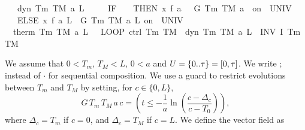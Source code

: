 \documentclass[envcountsame,envcountsect]{llncs}
\begin{document}
\begin{example}
\begin{isabellebody}
\ \ \ {\isachardoublequoteopen}dyn\ T\isactrlsub m\ T\isactrlsub M\ a\ L\ {\isasymtau}\ {\isasymequiv}\ \isanewline
\ \ {\isacharparenleft}IF\ {\isacharparenleft}{\isasymtheta}\ {\isacharequal}\ {}{\isacharparenright}\ THEN\ {\isacharparenleft}x{\isasymacute}{\isacharequal}\ f\ a\ {}\ {\isacharampersand}\ G\ T\isactrlsub m\ T\isactrlsub M\ a\ {}\ on\ {\isacharbraceleft}{}{\isachardot}{\isachardot}{\isasymtau}{\isacharbraceright}\ UNIV\ {\isacharat}\ {}{\isacharparenright}\ \isanewline
\ \ \ ELSE\ {\isacharparenleft}x{\isasymacute}{\isacharequal}\ f\ a\ L\ {\isacharampersand}\ G\ T\isactrlsub m\ T\isactrlsub M\ a\ L\ on\ {\isacharbraceleft}{}{\isachardot}{\isachardot}{\isasymtau}{\isacharbraceright}\ UNIV\ {\isacharat}\ {}{\isacharparenright}{\isacharparenright}{\isachardoublequoteclose}\isanewline
\isanewline
{}\isanewline
\ \ {\isachardoublequoteopen}therm\ T\isactrlsub m\ T\isactrlsub M\ a\ L\ {\isasymtau}\ {\isasymequiv}\ LOOP\ {\isacharparenleft}ctrl\ T\isactrlsub m\ T\isactrlsub M\ {\isacharsemicolon}\ dyn\ T\isactrlsub m\ T\isactrlsub M\ a\ L\ {\isasymtau}{\isacharparenright}\ INV\ {\isacharparenleft}I\ T\isactrlsub m\ T\isactrlsub M{\isacharparenright}{\isachardoublequoteclose}\isanewline
\end{isabellebody}

We assume that $0<T_m$, $T_M<L$, $0 < a$ and
$U={\emph{$\{$}}{0}{\emph{$\mathord.$}}{\emph{$\mathord.$}}{\emph{$\tau$}}{\emph{$\}$}}=[0,\tau]$. We write $;$ instead of $\cdot$ for sequential
composition. We use a guard to restrict evolutions between $T_m$ and
$T_M$ by setting, for $c\in\{0,L\}$,
\begin{equation*}
G\, T_m\, T_M\, a\, c = \left(t\leq -\frac{1}{a}\ln\left(\frac{c-\Delta_c}{c-T_0}\right)\right),
\end{equation*}
where $\Delta_c = T_m$ if $c=0$, and $\Delta_c = T_M$ if $c=L$. We
define the vector field as


\end{example}
\end{document}
